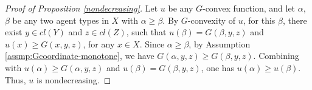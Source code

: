 \documentclass[a4paper, 11pt]{amsart}
\numberwithin{equation}{section}
\theoremstyle{plain}
\theoremstyle{definition}
\theoremstyle{remark}
\begin{document}
\vspace{0.3cm}

\begin{proof}[Proof of Proposition \ref{nondecreasing}]
	Let $u$ be any $G$-convex function, and let $\alpha$, $\beta$ be any two agent types in $X$ with $\alpha \ge \beta$. By $G$-convexity of $u$, for this $\beta$, there exist $y\in cl(Y)$ and $z \in cl(Z)$, such that $u(\beta)=G(\beta, y,z)$ and $u(x)\ge G(x, y,z)$, for any $x\in X$. Since $\alpha \ge \beta$, by Assumption \ref{assmp:Gcoordinate-monotone}, we have $G(\alpha, y,z)\ge G(\beta,y,z)$. Combining with $u(\alpha)\ge G(\alpha, y,z)$ and $u(\beta) = G(\beta,y,z)$, one has $u(\alpha) \ge u(\beta)$. Thus, $u$ is nondecreasing.
\end{proof}

\vspace{0.3cm}
\end{document}

